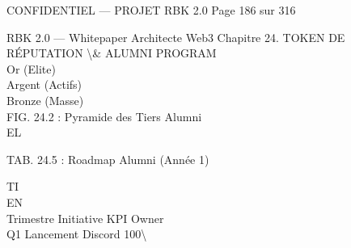 \vspace{0.5em}
\vspace{0.5em}
\vspace{0.5em}
\vspace{0.5em}
\begin{confidential}CONFIDENTIEL — PROJET RBK 2.0                                Page 186 sur 316\end{confidential}
RBK 2.0 — Whitepaper Architecte Web3                                          Chapitre 24. TOKEN DE RÉPUTATION \textbackslash{}& ALUMNI PROGRAM\\
\vspace{0.5em}
\vspace{0.5em}
\vspace{0.5em}
\vspace{0.5em}
Or (Elite)\\
\vspace{0.5em}
\vspace{0.5em}
Argent (Actifs)\\
\vspace{0.5em}
\vspace{0.5em}
Bronze (Masse)\\
\vspace{0.5em}
\vspace{0.5em}
FIG. 24.2 : Pyramide des Tiers Alumni\\
\vspace{0.5em}
\vspace{0.5em}
\vspace{0.5em}
\vspace{0.5em}
EL\\
\begin{center}\begin{tabular}TAB. 24.5 : Roadmap Alumni (Année 1)\end{tabular}\end{center}
\vspace{0.5em}
\vspace{0.5em}
\vspace{0.5em}
\vspace{0.5em}
TI\\
EN\\
Trimestre Initiative             KPI                 Owner\\
Q1        Lancement Discord      100\textbackslash{}%
\vspace{0.5em}
\vspace{0.5em}
\vspace{0.5em}
